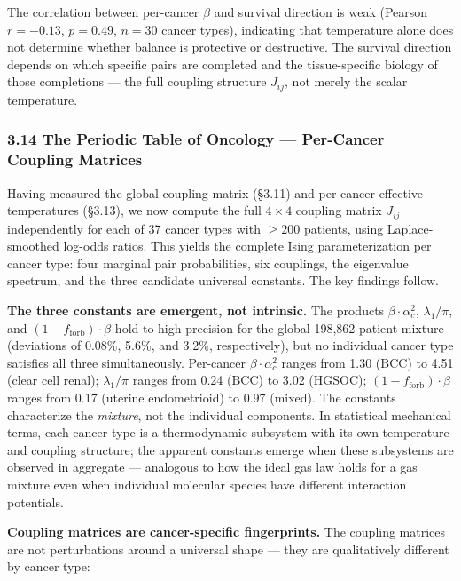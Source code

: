 \documentclass[
  11pt,
]{article}
\begin{document}
The correlation between per-cancer \(\beta\) and survival direction is
weak (Pearson \(r = -0.13\), \(p = 0.49\), \(n = 30\) cancer types),
indicating that temperature alone does not determine whether balance is
protective or destructive. The survival direction depends on which
specific pairs are completed and the tissue-specific biology of those
completions --- the full coupling structure \(J_{ij}\), not merely the
scalar temperature.

\subsubsection{3.14 The Periodic Table of Oncology --- Per-Cancer
Coupling
Matrices}\label{the-periodic-table-of-oncology-per-cancer-coupling-matrices}

Having measured the global coupling matrix (§3.11) and per-cancer
effective temperatures (§3.13), we now compute the full \(4 \times 4\)
coupling matrix \(J_{ij}\) independently for each of 37 cancer types
with \(\geq 200\) patients, using Laplace-smoothed log-odds ratios. This
yields the complete Ising parameterization per cancer type: four
marginal pair probabilities, six couplings, the eigenvalue spectrum, and
the three candidate universal constants. The key findings follow.

\textbf{The three constants are emergent, not intrinsic.} The products
\(\beta \cdot \alpha_c^2\), \(\lambda_1/\pi\), and
\((1 - f_\mathrm{forb}) \cdot \beta\) hold to high precision for the
global 198,862-patient mixture (deviations of 0.08\%, 5.6\%, and 3.2\%,
respectively), but no individual cancer type satisfies all three
simultaneously. Per-cancer \(\beta \cdot \alpha_c^2\) ranges from 1.30
(BCC) to 4.51 (clear cell renal); \(\lambda_1/\pi\) ranges from 0.24
(BCC) to 3.02 (HGSOC); \((1 - f_\mathrm{forb}) \cdot \beta\) ranges from
0.17 (uterine endometrioid) to 0.97 (mixed). The constants characterize
the \emph{mixture}, not the individual components. In statistical
mechanical terms, each cancer type is a thermodynamic subsystem with its
own temperature and coupling structure; the apparent constants emerge
when these subsystems are observed in aggregate --- analogous to how the
ideal gas law holds for a gas mixture even when individual molecular
species have different interaction potentials.

\textbf{Coupling matrices are cancer-specific fingerprints.} The
coupling matrices are not perturbations around a universal shape ---
they are qualitatively different by cancer type:
\end{document}
